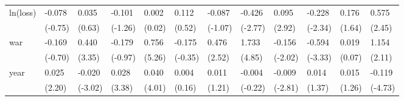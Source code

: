 \begin{tabular}{p{1.5cm} p{2cm} p{1.7cm} p{1.7cm} p{1.7cm} p{1.7cm} p{1.7cm} p{1.7cm} p{1.7cm} p{1.7cm} p{1.7cm} p{1.7cm}}
\hline
ln(loss)        &   -0.078         &    0.035         &   -0.101         &    0.002         &    0.112         &   -0.087         &   -0.426\sym{*}  &    0.095\sym{**} &   -0.228\sym{*}  &    0.176         &    0.575\sym{*}  \\
                &  (-0.75)         &   (0.63)         &  (-1.26)         &   (0.02)         &   (0.52)         &  (-1.07)         &  (-2.77)         &   (2.92)         &  (-2.34)         &   (1.64)         &   (2.45)         \\
war             &   -0.169         &    0.440\sym{**} &   -0.179         &    0.756\sym{***}&   -0.175         &    0.476\sym{*}  &    1.733\sym{***}&   -0.156         &   -0.594\sym{**} &    0.019         &    1.154         \\
                &  (-0.70)         &   (3.35)         &  (-0.97)         &   (5.26)         &  (-0.35)         &   (2.52)         &   (4.85)         &  (-2.02)         &  (-3.33)         &   (0.07)         &   (2.11)         \\
year            &    0.025         &   -0.020\sym{**} &    0.028\sym{**} &    0.040\sym{**} &    0.004         &    0.011         &   -0.004         &   -0.009\sym{**} &    0.014         &    0.015         &   -0.119\sym{***}\\
                &   (2.20)         &  (-3.02)         &   (3.38)         &   (4.01)         &   (0.16)         &   (1.21)         &  (-0.22)         &  (-2.81)         &   (1.37)         &   (1.26)         &  (-4.73)         \\
\end{tabular}
\def\sym#1{\ifmmode^{#1}\else\(^{#1}\)\fi}
